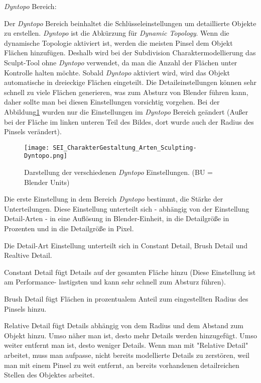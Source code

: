 \textit{Dyntopo} Bereich\citep{blender:dyn_top}:

Der \textit{Dyntopo} Bereich beinhaltet die Schlüsseleinstellungen um detaillierte Objekte zu erstellen.
\textit{Dyntopo} ist die Abkürzung für \textit{Dynamic Topology}. Wenn die dynamische Topologie aktiviert ist,
werden die meisten Pinsel dem Objekt Flächen hinzufügen. Deshalb wird bei der Subdivision Charaktermodellierung
das Sculpt-Tool ohne \textit{Dyntopo} verwendet, da man die Anzahl der Flächen unter Kontrolle halten möchte.
Sobald \textit{Dyntopo} aktiviert wird, wird das Objekt automatische in dreieckige Flächen eingeteilt.
Die Detaileinstellungen können sehr schnell zu viele Flächen generieren, was zum Absturz von Blender führen kann,
daher sollte man bei diesen Einstellungen vorsichtig vorgehen. Bei der Abbildung\ref{picture:dynTopo} wurden nur die
Einstellungen im \textit{Dyntopo} Bereich geändert (Außer bei der Fläche im linken unteren Teil des Bildes, dort
wurde auch der Radius des Pinsels verändert).

\begin{figure}[H]
    \centering
    \texttt{[image: SEI\_CharakterGestaltung\_Arten\_Sculpting-Dyntopo.png]}
    \caption{Darstellung der verschiedenen \textit{Dyntopo} Einstellungen. (BU = Blender Units)}
    \label{picture:dynTopo}
\end{figure}

Die erste Einstellung in dem Bereich \textit{Dyntopo} bestimmt, die Stärke der Unterteilungen. Diese Einstellung
unterteilt sich - abhängig von der Einstellung Detail-Arten - in eine Auflösung in Blender-Einheit, in die
Detailgröße in Prozenten und in die Detailgröße in Pixel.

Die Detail-Art Einstellung unterteilt sich in Constant Detail, Brush Detail und Realtive Detail.

Constant Detail fügt Details auf der gesamten Fläche hinzu (Diese Einstellung ist am Performance-
lastigsten und kann sehr schnell zum Absturz führen).

Brush Detail fügt Flächen in prozentualem Anteil zum eingestellten Radius des Pinsels hinzu.

Relative Detail fügt Details abhängig von dem Radius und dem Abstand zum Objekt
hinzu. Umso näher man ist, desto mehr Details werden hinzugefügt. Umso weiter entfernt man ist, desto
weniger Details. Wenn man mit "Relative Detail" arbeitet, muss man aufpasse, nicht bereits modellierte Details
zu zerstören, weil man mit einem Pinsel zu weit entfernt, an bereits vorhandenen detailreichen Stellen des
Objektes arbeitet.

